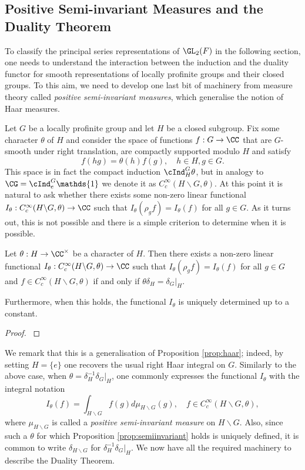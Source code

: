\subsection{Positive Semi-invariant Measures and the Duality Theorem}

To classify the principal series representations of $\GL_2(F)$ in the following section, one needs to understand the interaction between the induction and the duality functor for smooth representations of locally profinite groups and their closed groups. To this aim, we need to develop one last bit of machinery from measure theory called \textit{positive semi-invariant measures}, which generalise the notion of Haar measures.

Let $G$ be a locally profinite group and let $H$ be a closed subgroup. Fix some character $\theta$ of $H$ and consider the space of functions $f:G\to\CC$ that are $G$-smooth under right translation, are compactly supported modulo $H$ and satisfy $$f(hg)=\theta(h)f(g),\quad h\in H,g\in G.$$
This space is in fact the compact induction $\cInd_H^G\theta$, but in analogy to $\CG=\cInd_{e}^G\mathds{1}$ we denote it as $C_c^{\infty}(H\backslash G,\theta)$. At this point it is natural to ask whether there exists some non-zero linear functional $I_{\theta}:C_c^{\infty}(H\backslash G,\theta)\to\CC$ such that $I_{\theta}(\rho_g f)=I_{\theta}(f)$ for all $g\in G$. As it turns out, this is not possible and there is a simple criterion to determine when it is possible.

\begin{prop}\label{prop:semiinvariant}
    Let $\theta:H\to\CC^{\times}$ be a character of $H$. Then there exists a non-zero linear functional $I_{\theta}:C_c^{\infty}(H\backslash G,\theta)\to\CC$ such that $I_{\theta}(\rho_g f)=I_{\theta}(f)$ for all $g\in G$ and $f\in C_c^{\infty}(H\backslash G,\theta)$ if and only if $\theta\delta_H=\delta_G|_H$.

    Furthermore, when this holds, the functional $I_\theta$ is uniquely determined up to a constant.
\end{prop}
\begin{proof}
    \cite[3.4 Proposition]{BH1}
\end{proof}

We remark that this is a generalisation of Proposition \ref{prop:haar}; indeed, by setting $H=\{e\}$ one recovers the usual right Haar integral on $G$. Similarly to the above case, when $\theta=\delta_H^{-1}\delta_G|_H$, one commonly expresses the functional $I_\theta$ with the integral notation 
$$I_\theta(f)=\int_{H\backslash G}f(g)d\mu_{H\backslash G}(g),\quad f\in C_c^{\infty}(H\backslash G,\theta),$$
where $\mu_{H\backslash G}$ is called a \textit{positive semi-invariant measure} on $H\backslash G$. Also, since such a $\theta$ for which Proposition \ref{prop:semiinvariant} holds is uniquely defined, it is common to write $\delta_{H\backslash G}$ for $\delta_H^{-1}\delta_G|_H$. We now have all the required machinery to describe the Duality Theorem.

